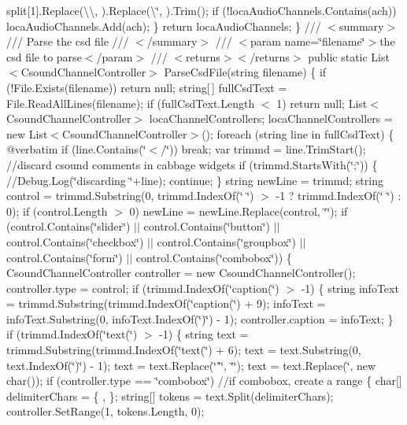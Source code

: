split\mbox{[}1\mbox{]}.\+Replace(\textquotesingle{}\textbackslash{}\textbackslash{}\textquotesingle{}, \textquotesingle{} \textquotesingle{}).\+Replace(\textquotesingle{}\textbackslash{}\char`\"{}\textquotesingle{}, \textquotesingle{} \textquotesingle{}).\+Trim();         if (!loca\+Audio\+Channels.\+Contains(ach))             loca\+Audio\+Channels.\+Add(ach);     \}     return loca\+Audio\+Channels; \}  ///  $<$summary$>$ /// Parse the csd file /// $<$/summary$>$ /// $<$param name=\char`\"{}filename\char`\"{}$>$the csd file to parse$<$/param$>$ /// $<$returns$>$$<$/returns$>$ public static List$<$\+Csound\+Channel\+Controller$>$ Parse\+Csd\+File(string filename) \{     if (!\+File.\+Exists(filename)) return null;      string\mbox{[}$\,$\mbox{]} full\+Csd\+Text = File.\+Read\+All\+Lines(filename);     if (full\+Csd\+Text.\+Length $<$ 1) return null;      List$<$\+Csound\+Channel\+Controller$>$ loca\+Channel\+Controllers;     loca\+Channel\+Controllers = new List$<$\+Csound\+Channel\+Controller$>$();      foreach (string line in full\+Csd\+Text)     \{ @verbatim  if (line.\+Contains(\char`\"{}\texorpdfstring{$<$}{<}/\char`\"{}))     break;  var trimmd = line.\+Trim\+Start(); //discard csound comments in cabbage widgets if (trimmd.\+Starts\+With(\char`\"{};\char`\"{})) \{     //\+Debug.\+Log(\char`\"{}discarding \char`\"{}+line);     continue; \} string new\+Line = trimmd; string control = trimmd.\+Substring(0, trimmd.\+Index\+Of(\char`\"{} \char`\"{}) $>$ -\/1 ? trimmd.\+Index\+Of(\char`\"{} \char`\"{}) \+: 0); if (control.\+Length $>$ 0)     new\+Line = new\+Line.\+Replace(control, \char`\"{}\char`\"{});  if (control.\+Contains(\char`\"{}slider\char`\"{}) $\vert$$\vert$ control.\+Contains(\char`\"{}button\char`\"{}) $\vert$$\vert$ control.\+Contains(\char`\"{}checkbox\char`\"{})     $\vert$$\vert$ control.\+Contains(\char`\"{}groupbox\char`\"{}) $\vert$$\vert$ control.\+Contains(\char`\"{}form\char`\"{}) $\vert$$\vert$ control.\+Contains(\char`\"{}combobox\char`\"{})) \{     Csound\+Channel\+Controller controller = new Csound\+Channel\+Controller();     controller.\+type = control;      if (trimmd.\+Index\+Of(\char`\"{}caption(\char`\"{}) $>$ -\/1)     \{         string info\+Text = trimmd.\+Substring(trimmd.\+Index\+Of(\char`\"{}caption(\char`\"{}) + 9);         info\+Text = info\+Text.\+Substring(0, info\+Text.\+Index\+Of(\char`\"{})\char`\"{}) -\/ 1);         controller.\+caption = info\+Text;     \}      if (trimmd.\+Index\+Of(\char`\"{}text(\char`\"{}) $>$ -\/1)     \{         string text = trimmd.\+Substring(trimmd.\+Index\+Of(\char`\"{}text(\char`\"{}) + 6);         text = text.\+Substring(0, text.\+Index\+Of(\char`\"{})\char`\"{}) -\/ 1);         text = text.\+Replace(\char`\"{}"{}\char`\"{}, \char`\"{}\char`\"{});         text = text.\+Replace(\textquotesingle{}\char`\"{}\textquotesingle{}, new char()); if (controller.\+type == \char`\"{}combobox\char`\"{}) //if combobox, create a range \{ char\mbox{[}\mbox{]} delimiter\+Chars = \{ \textquotesingle{},\textquotesingle{} \}; string\mbox{[}\mbox{]} tokens = text.\+Split(delimiter\+Chars); controller.\+Set\+Range(1, tokens.\+Length, 0);

